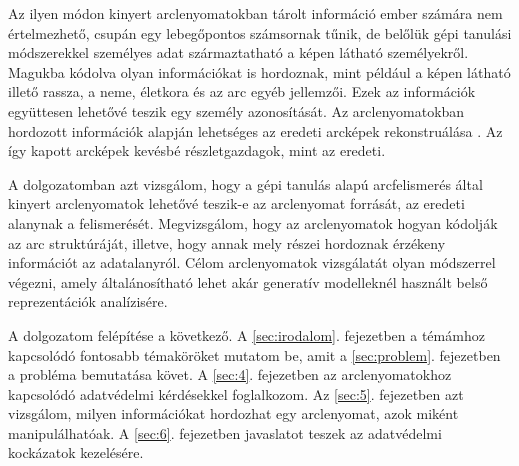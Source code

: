 
Az ilyen módon kinyert arclenyomatokban tárolt információ ember számára nem értelmezhető, csupán egy lebegőpontos számsornak tűnik, de belőlük gépi tanulási módszerekkel személyes adat származtatható a képen látható személyekről. Magukba kódolva olyan információkat is hordoznak, mint például a képen látható illető rassza, a neme, életkora és az arc egyéb jellemzői. Ezek az információk együttesen lehetővé teszik egy személy azonosítását. Az arclenyomatokban hordozott információk alapján lehetséges az eredeti arcképek rekonstruálása \cite{mai2018reconstruction}. Az így kapott arcképek kevésbé részletgazdagok, mint az eredeti.





A dolgozatomban azt vizsgálom, hogy a gépi tanulás alapú arcfelismerés által kinyert arclenyomatok lehetővé teszik-e az arclenyomat forrását, az eredeti alanynak a felismerését. Megvizsgálom, hogy az arclenyomatok hogyan kódolják az arc struktúráját, illetve, hogy annak mely részei hordoznak érzékeny információt az adatalanyról. Célom arclenyomatok vizsgálatát olyan módszerrel végezni, amely általánosítható lehet akár generatív modelleknél használt belső reprezentációk analízisére.

A dolgozatom felépítése a következő. A \ref{sec:irodalom}. fejezetben a témámhoz kapcsolódó fontosabb témaköröket mutatom be, amit a \ref{sec:problem}. fejezetben a probléma bemutatása követ. A \ref{sec:4}. fejezetben az arclenyomatokhoz kapcsolódó adatvédelmi kérdésekkel foglalkozom. Az \ref{sec:5}. fejezetben azt vizsgálom, milyen információkat hordozhat egy arclenyomat, azok miként manipulálhatóak. A \ref{sec:6}. fejezetben javaslatot teszek az adatvédelmi kockázatok kezelésére.

